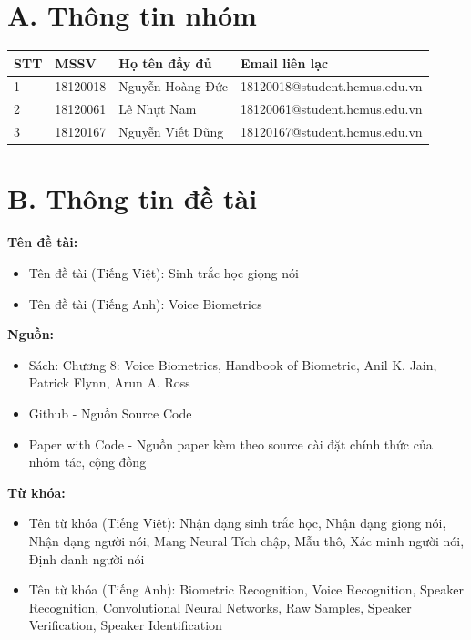 \documentclass{article}
\newcommand\T{\rule{0pt}{2.6ex}}       %
\newcommand\B{\rule[-1.2ex]{0pt}{0pt}} %
\begin{document}
	\newpage
	\tableofcontents
	\newpage
	\setcounter{secnumdepth}{0}
	
	\section{A. Thông tin nhóm}
	\begin{table}[H]
		\begin{tabular}{ | p{1cm} |  p{3cm} | p{5cm} | p{5cm}  |}\hline
			STT	& MSSV & Họ tên đầy đủ & Email liên lạc \T\B\\\hline
			1	& 18120018 & Nguyễn Hoàng Đức &  18120018@student.hcmus.edu.vn\T\B\\\hline
			2	& 18120061 & Lê Nhựt Nam &  18120061@student.hcmus.edu.vn\T\B\\\hline
			3	& 18120167 & Nguyễn Viết Dũng & 18120167@student.hcmus.edu.vn\T\B\\ \hline
		\end{tabular}
	\end{table}		
	\section{B. Thông tin đề tài}
	
	\textbf{Tên đề tài:} 
	\begin{itemize}
		\item Tên đề tài (Tiếng Việt): Sinh trắc học giọng nói
		\item Tên đề tài (Tiếng Anh): Voice Biometrics
	\end{itemize}
	\textbf{Nguồn:} 
	\begin{itemize}
		\item Sách: Chương 8: Voice Biometrics, Handbook of Biometric, Anil K. Jain, Patrick Flynn, Arun A.
		Ross
		\item Github - Nguồn Source Code
		\item Paper with Code - Nguồn paper kèm theo source cài đặt chính thức của nhóm tác, cộng đồng
	\end{itemize}
	\textbf{Từ khóa:} 
	\begin{itemize}
		\item Tên từ khóa (Tiếng Việt): Nhận dạng sinh trắc học, Nhận dạng giọng nói, Nhận dạng người nói, Mạng Neural Tích chập, Mẫu thô, Xác minh người nói, Định danh người nói
		\item 	Tên từ khóa (Tiếng Anh): Biometric Recognition, Voice Recognition, Speaker Recognition, Convolutional Neural Networks, Raw Samples, Speaker Verification, Speaker Identification
	\end{itemize}
	
\end{document}

